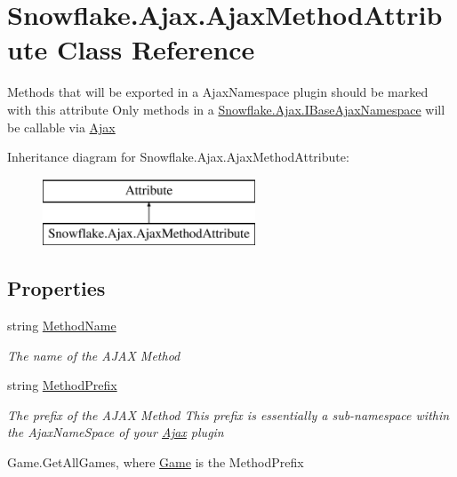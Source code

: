 \hypertarget{class_snowflake_1_1_ajax_1_1_ajax_method_attribute}{}\section{Snowflake.\+Ajax.\+Ajax\+Method\+Attribute Class Reference}
\label{class_snowflake_1_1_ajax_1_1_ajax_method_attribute}


Methods that will be exported in a Ajax\+Namespace plugin should be marked with this attribute Only methods in a \hyperlink{interface_snowflake_1_1_ajax_1_1_i_base_ajax_namespace}{Snowflake.\+Ajax.\+I\+Base\+Ajax\+Namespace} will be callable via \hyperlink{namespace_snowflake_1_1_ajax}{Ajax}  


Inheritance diagram for Snowflake.\+Ajax.\+Ajax\+Method\+Attribute\+:\begin{figure}[H]
\begin{center}
\leavevmode
\includegraphics[height=2.000000cm]{class_snowflake_1_1_ajax_1_1_ajax_method_attribute}
\end{center}
\end{figure}
\subsection*{Properties}
\begin{DoxyCompactItemize}
\item 
string \hyperlink{class_snowflake_1_1_ajax_1_1_ajax_method_attribute_ace2bd4864bda17e7a7e6fdb3c4e3d82f}{Method\+Name}
\begin{DoxyCompactList}\small\item\em The name of the A\+J\+A\+X Method \end{DoxyCompactList}\item 
string \hyperlink{class_snowflake_1_1_ajax_1_1_ajax_method_attribute_a63f45d38381adbe0f3be6d740ccdefab}{Method\+Prefix}
\begin{DoxyCompactList}\small\item\em The prefix of the A\+J\+A\+X Method This prefix is essentially a sub-\/namespace within the Ajax\+Name\+Space of your \hyperlink{namespace_snowflake_1_1_ajax}{Ajax} plugin 

Game.\+Get\+All\+Games, where \hyperlink{namespace_snowflake_1_1_game}{Game} is the Method\+Prefix\end{DoxyCompactList}\end{DoxyCompactItemize}


